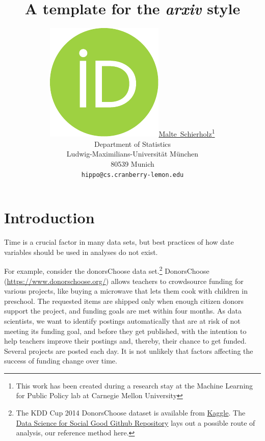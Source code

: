 \documentclass{article}
\title{A template for the \emph{arxiv} style}
\author{ \href{https://orcid.org/0000-0003-4058-1543}{\includegraphics[scale=0.06]{orcid.pdf}\hspace{1mm}Malte~Schierholz}\thanks{This work has been created during a research stay at the Machine Learning for Public Policy lab at Carnegie Mellon University} \\
	Department of Statistics\\
	Ludwig-Maximilians-Universität München\\
	80539 Munich \\
	\texttt{hippo@cs.cranberry-lemon.edu} \\
}
\begin{document}
\maketitle

\begin{abstract}
	\lipsum[1]
\end{abstract}




\section{Introduction}\label{sec:introduction}

Time is a crucial factor in many data sets, but best practices of how date variables should be used in analyses do not exist.

For example, consider the donorsChoose data set.\footnote{The KDD Cup 2014 DonorsChoose dataset is available from \href{https://www.kaggle.com/c/kdd-cup-2014-predicting-excitement-at-donors-choose/data}{Kaggle}. The \href{https://github.com/dssg/donors-choose}{Data Science for Social Good Github Repository} lays out a possible route of analysis, our reference method here.} DonorsChoose (\url{https://www.donorschoose.org/}) allows teachers to crowdsource funding for various projects, like buying a microwave that lets them cook with children in preschool. The requested items are shipped only when enough citizen donors support the project, and funding goals are met within four months. As data scientists, we want to identify postings automatically that are at risk of not meeting its funding goal, and before they get published, with the intention to help teachers improve their postings and, thereby, their chance to get funded. Several projects are posted each day. It is not unlikely that factors affecting the success of funding change over time.
\end{document}
